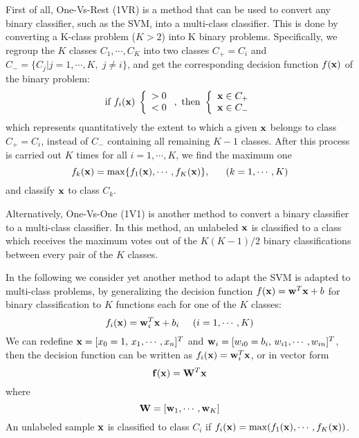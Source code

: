 \documentclass{article}
\begin{document}
First of all, One-Vs-Rest (1VR) is a method that can be used to
convert any binary classifier, such as the SVM, into a multi-class 
classifier. This is done by converting a K-class problem ($K>2$)
into K binary problems. Specifically, we regroup the $K$ classes 
$C_1,\cdots,C_K$ into two classes $C_+=C_i$ and 
$C_-=\{C_j|j=1,\cdots,K,\;j\ne i\}$, and get the corresponding 
decision function $f({\bf x})$ of the binary problem:
\begin{equation}
  \mbox{if   } f_i({\bf x})\; \left\{\begin{array}{l}>0 \\<0 \end{array}\right.,
  \mbox{   then   } \left\{\begin{array}{l}{\bf x}\in C_+\\
  {\bf x}\in C_-\end{array}\right.
\end{equation}
which represents quantitatively the extent to which a given 
${\bf x}$ belongs to class $C_+=C_i$, instead of $C_-$ containing 
all remaining $K-1$ classes. After this process is carried out $K$ 
times for all $i=1,\cdots,K$, we find the maximum one
\begin{equation}
  f_k({\bf x})=\max\{f_1({\bf x}),\cdots,f_K({\bf x})\},
  \;\;\;\;\;\;(k=1,\cdots,K)
\end{equation}
and classify ${\bf x}$ to class $C_k$.

Alternatively, One-Vs-One (1V1) is another method to convert a
binary classifier to a multi-class classifier. In this method, an
unlabeled ${\bf x}$ is classified to a class which receives the
maximum votes out of the $K(K-1)/2$ binary classifications between 
every pair of the $K$ classes. 

In the following we consider yet another method to adapt the SVM 
is adapted to multi-class problems, by generalizing the decision 
function $f({\bf x})={\bf w}^T{\bf x}+b$ for binary classification
to $K$ functions each for one of the $K$ classes:
\begin{equation}
  f_i({\bf x})={\bf w}_i^T{\bf x}+b_i\;\;\;\;\;(i=1,\cdots,K)
\end{equation}
We can redefine ${\bf x}=[x_0=1,\,x_1,\cdots,x_n]^T$ and 
${\bf w}_i=[w_{i0}=b_i,\,w_{i1},\cdots,w_{in}]^T$, then the 
decision function can be written as $f_i({\bf x})={\bf w}_i^T{\bf x}$,
or in vector form
\begin{equation}
  {\bf f}({\bf x})={\bf W}^T{\bf x}
\end{equation}
where
\begin{equation}
  {\bf W}=[{\bf w}_1,\cdots,{\bf w}_K]
\end{equation}
An unlabeled sample ${\bf x}$ is classified to class $C_i$ if
$f_i({\bf x})=\max(f_1({\bf x}),\cdots,f_K({\bf x}))$. 
\end{document}
